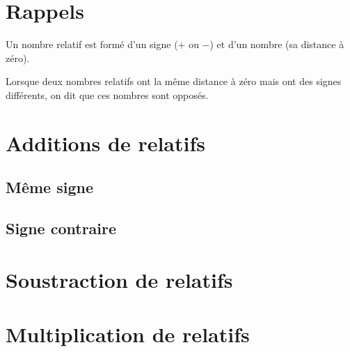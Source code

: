 \documentclass[11pt]{article}
\begin{document}
\section{Rappels}

\begin{propriete}
Un nombre relatif est formé d’un signe (+ ou −) et d’un nombre (sa distance à zéro).
\end{propriete}

\begin{definition}
Lorsque deux nombres relatifs ont la même distance à zéro mais ont des
signes différents, on dit que ces nombres sont opposés.
\end{definition}

\begin{exemple}

\end{exemple}

\section{Additions de relatifs}

\subsection{Même signe}

\subsection{Signe contraire}

\section{Soustraction de relatifs}

\section{Multiplication de relatifs}
\end{document}
